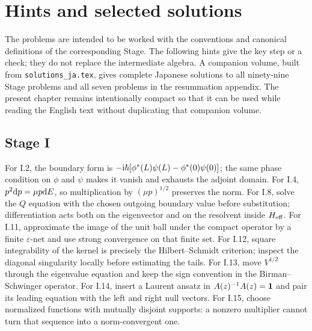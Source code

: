 \chapter{Hints and selected solutions}
\label{chap:solutions}

The problems are intended to be worked with the conventions and canonical
definitions of the corresponding Stage.  The following hints give the key
step or a check; they do not replace the intermediate algebra.  A companion
volume, built from \texttt{solutions\_ja.tex}, gives complete Japanese
solutions to all ninety-nine Stage problems and all seven problems in the
resummation appendix.  The present chapter remains intentionally compact so
that it can be used while reading the English text without duplicating that
companion volume.

\section*{Stage I}
For I.2, the boundary form is
$-\mathrm{i}\hbar[\phi^*(L)\psi(L)-\phi^*(0)\psi(0)]$; the same phase condition on
$\phi$ and $\psi$ makes it vanish and exhausts the adjoint domain.  For I.4,
$p^2\mathrm{d} p=\mu p\mathrm{d} E$, so multiplication by $(\mu p)^{1/2}$ preserves the
norm.  For I.8, solve the $Q$ equation with the chosen outgoing boundary value
before substitution; differentiation acts both on the eigenvector and on the
resolvent inside $H_{\mathrm{eff}}$.
For I.11, approximate the image of the unit ball under the compact operator
by a finite $\varepsilon$-net and use strong convergence on that finite set.
For I.12, square integrability of the kernel is precisely the
Hilbert--Schmidt criterion; inspect the diagonal singularity locally before
estimating the tails.  For I.13, move $V^{1/2}$ through the eigenvalue
equation and keep the sign convention in the Birman--Schwinger operator.
For I.14, insert a Laurent ansatz in $A(z)^{-1}A(z)=\mathbf{1}$ and pair its
leading equation with the left and right null vectors.  For I.15, choose
normalized functions with mutually disjoint supports: a nonzero multiplier
cannot turn that sequence into a norm-convergent one.

